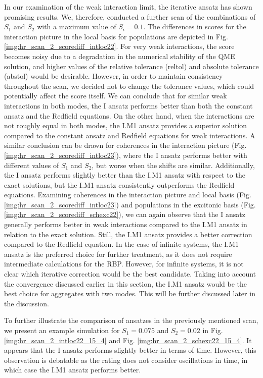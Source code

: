 In our examination of the weak interaction limit, the iterative ansatz has shown promising results. We, therefore, conducted a further scan of the combinations of $S_1$ and $S_2$ with a maximum value of $S_i = 0.1$. The differences in scores for the interaction picture in the local basis for populations are depicted in Fig. \ref{img:hr_scan_2_scorediff_intloc22}. For very weak interactions, the score becomes noisy due to a degradation in the numerical stability of the QME solution, and higher values of the relative tolerance (reltol) and absolute tolerance (abstol) would be desirable. However, in order to maintain consistency throughout the scan, we decided not to change the tolerance values, which could potentially affect the score itself. We can conclude that for similar weak interactions in both modes, the I ansatz performs better than both the constant ansatz and the Redfield equations. On the other hand, when the interactions are not roughly equal in both modes, the I.M1 ansatz provides a superior solution compared to the constant ansatz and Redfield equations for weak interactions. A similar conclusion can be drawn for coherences in the interaction picture (Fig. \ref{img:hr_scan_2_scorediff_intloc23}), where the I ansatz performs better with different values of $S_1$ and $S_2$, but worse when the shifts are similar. Additionally, the I ansatz performs slightly better than the I.M1 ansatz with respect to the exact solutions, but the I.M1 ansatz consistently outperforms the Redfield equations. Examining coherences in the interaction picture and local basis (Fig. \ref{img:hr_scan_2_scorediff_intloc23}) and populations in the excitonic basis (Fig. \ref{img:hr_scan_2_scorediff_schexc22}), we can again observe that the I ansatz generally performs better in weak interactions compared to the I.M1 ansatz in relation to the exact solution. Still, the I.M1 ansatz provides a better correction compared to the Redfield equation. In the case of infinite systems, the I.M1 ansatz is the preferred choice for further treatment, as it does not require intermediate calculations for the RBP. However, for infinite systems, it is not clear which iterative correction would be the best candidate. Taking into account the convergence discussed earlier in this section, the I.M1 ansatz would be the best choice for aggregates with two modes. This will be further discussed later in the discussion. 

To further illustrate the comparison of ansatzes in the previously mentioned scan, we present an example simulation for $S_1 = 0.075$ and $S_2 = 0.02$ in Fig. \ref{img:hr_scan_2_intloc22_15_4} and Fig. \ref{img:hr_scan_2_schexc22_15_4}. It appears that the I ansatz performs slightly better in terms of time. However, this observation is debatable as the rating does not consider oscillations in time, in which case the I.M1 ansatz performs better.

